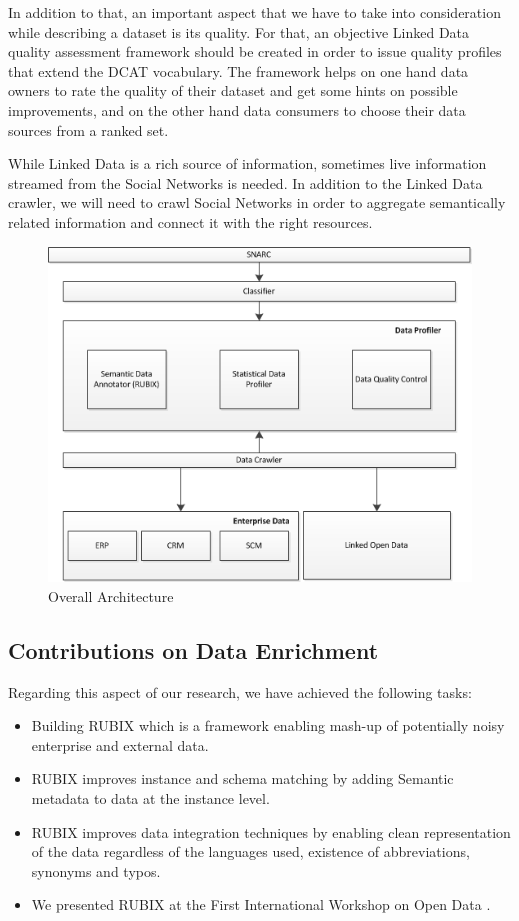 \documentclass[onecolumn, crcready]{iosart2c}
\begin{document}
In addition to that, an important aspect that we have to take into consideration while describing a dataset is its quality. For that, an objective Linked Data quality assessment framework should be created in order to issue quality profiles that extend the DCAT vocabulary. The framework helps on one hand data owners to rate the quality of their dataset and get some hints on possible improvements, and on the other hand data consumers to choose their data sources from a ranked set. 

While Linked Data is a rich source of information, sometimes live information streamed from the Social Networks is needed. In addition to the Linked Data crawler, we will need to crawl Social Networks in order to aggregate semantically related information and connect it with the right resources. 

\begin{figure}[ht!]
  \centering
    \includegraphics[scale=0.8]{overall-architecture.png} 
  \caption{Overall Architecture}
\end{figure}

\subsection{Contributions on Data Enrichment}
Regarding this aspect of our research, we have achieved the following tasks:
 \begin{itemize}
 \item Building RUBIX which is a framework enabling mash-up of potentially noisy enterprise and external data.
 \item RUBIX improves instance and schema matching by adding Semantic metadata to data at the instance level.
 \item RUBIX improves data integration techniques by enabling clean representation of the data regardless of the languages used, existence of abbreviations, synonyms and typos. 
 \item We presented RUBIX at the First International Workshop on Open Data \cite{Assaf:2012:RFI:2422604.2422607}\cite{DBLP:journals/corr/abs-1205-2691}.
\end{itemize}
\end{document}
